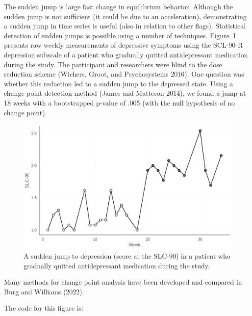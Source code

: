 \documentclass[
  a4paper,
  DIV=11,
  numbers=noendperiod,
  oneside]{scrreprt}
\begin{document}
The sudden jump is large fast change in equilibrium behavior. Although
the sudden jump is not sufficient (it could be due to an acceleration),
demonstrating a sudden jump in time series is useful (also in relation
to other flags). Statistical detection of sudden jumps is possible using
a number of techniques. Figure~\ref{fig-ch3-img19-old-31} presents raw
weekly measurements of depressive symptoms using the SCL-90-R depression
subscale of a patient who gradually quitted antidepressant medication
during the study. The participant and researchers were blind to the dose
reduction scheme (Wichers, Groot, and Psychosystems 2016). One question
was whether this reduction led to a sudden jump to the depressed state.
Using a change point detection method (James and Matteson 2014), we
found a jump at 18 weeks with a bootstrapped p-value of .005 (with the
null hypothesis of no change point).

\begin{figure}

{\centering \includegraphics{media/ch3/fig-ch3-img19-old-31.jpg}

}

\caption{\label{fig-ch3-img19-old-31}A sudden jump to depression (score
at the SLC-90) in a patient who gradually quitted antidepressant
medication during the study.}

\end{figure}

Many methods for change point analysis have been developed and compared
in Burg and Williams (2022).

The code for this figure is:
\end{document}
